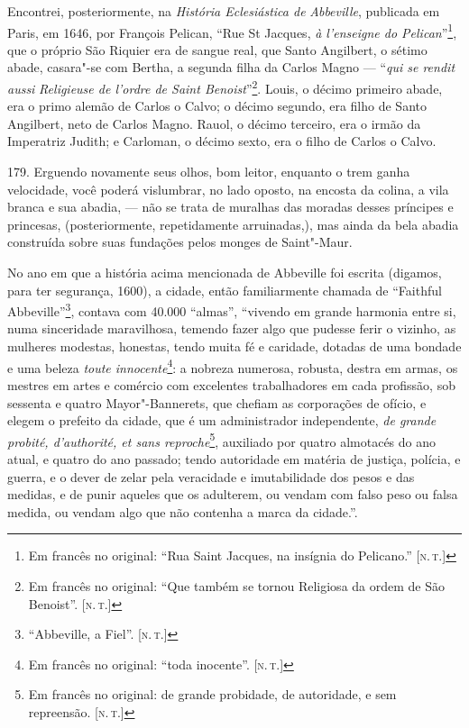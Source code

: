 Encontrei, posteriormente, na \emph{História Eclesiástica de}
\emph{Abbeville}, publicada em Paris, em 1646, por François Pelican,
``Rue St Jacques, \emph{à l'enseigne do Pelican}''\footnote{Em francês
  no original: ``Rua Saint Jacques, na insígnia do Pelicano.'' {[}\textsc{n.\,t.}{]}}, que o próprio São Riquier era de sangue real, que Santo
Angilbert, o sétimo abade, casara"-se com Bertha, a segunda filha da
Carlos Magno --- ``\emph{qui se rendit aussi} \emph{Religieuse de l'ordre
de Saint Benoist}''\footnote{Em francês no original: ``Que também se
  tornou Religiosa da ordem de São Benoist''. {[}\textsc{n.\,t.}{]}}. Louis, o
décimo primeiro abade, era o primo alemão de Carlos o Calvo; o décimo
segundo, era filho de Santo Angilbert, neto de Carlos Magno. Rauol, o
décimo terceiro, era o irmão da Imperatriz Judith; e Carloman, o décimo
sexto, era o filho de Carlos o Calvo.

179. Erguendo novamente seus olhos, bom leitor, enquanto o trem ganha
velocidade, você poderá vislumbrar, no lado oposto, na encosta da
colina, a vila branca e sua abadia, --- não se trata de muralhas das
moradas desses príncipes e princesas, (posteriormente, repetidamente
arruinadas,), mas ainda da bela abadia construída sobre suas fundações
pelos monges de Saint"-Maur.

No ano em que a história acima mencionada de Abbeville foi escrita
(digamos, para ter segurança, 1600), a cidade, então familiarmente
chamada de ``Faithful Abbeville''\footnote{``Abbeville, a Fiel''. {[}\textsc{n.\,t.}{]}}, contava com 40.000 ``almas'', ``vivendo em grande harmonia
entre si, numa sinceridade maravilhosa, temendo fazer algo que pudesse
ferir o vizinho, as mulheres modestas, honestas, tendo muita fé e
caridade, dotadas de uma bondade e uma beleza \emph{toute
innocente}\footnote{Em francês no original: ``toda inocente''. {[}\textsc{n.\,t.}{]}}: a nobreza numerosa, robusta, destra em armas, os mestres em
artes e comércio com excelentes trabalhadores em cada profissão, sob
sessenta e quatro Mayor"-Bannerets, que chefiam as corporações de ofício,
e elegem o prefeito da cidade, que é um administrador independente,
\emph{de grande probité, d'authorité, et sans reproche}\footnote{Em
  francês no original: de grande probidade, de autoridade, e sem
  repreensão. {[}\textsc{n.\,t.}{]}}, auxiliado por quatro almotacés do ano
atual, e quatro do ano passado; tendo autoridade em matéria de justiça,
polícia, e guerra, e o dever de zelar pela veracidade e imutabilidade
dos pesos e das medidas, e de punir aqueles que os adulterem, ou vendam
com falso peso ou falsa medida, ou vendam algo que não contenha a marca
da cidade.''.

